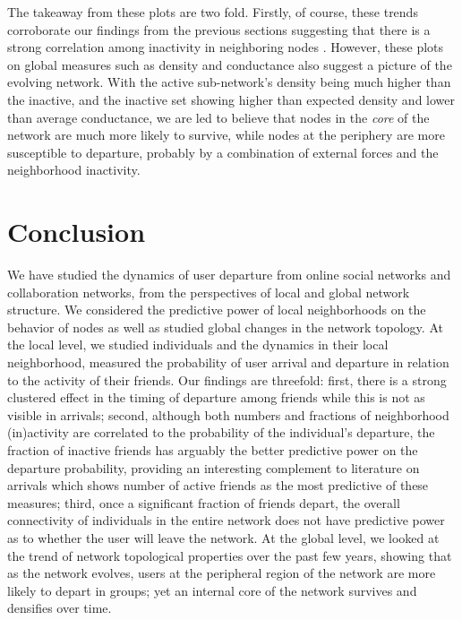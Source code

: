 \documentclass[phd,tocprelim]{cornell}
\begin{document}
The takeaway from these plots are two fold. Firstly, of course, these trends
corroborate our findings from the previous sections suggesting that there is a
strong correlation among inactivity in neighboring nodes 
. However, these plots on global measures such as density and conductance
also suggest a picture of the evolving network. With the active sub-network's density
being much higher than the inactive, and the inactive set showing higher than
expected density and lower than average conductance, we are led to believe that
nodes in the {\em core} of the network are much more likely to survive, while
nodes at the periphery are more susceptible to departure, probably by a combination of external forces and the neighborhood inactivity.

\section{Conclusion}
We have studied the dynamics of user departure from
online social networks and collaboration networks, from the perspectives of local and global network structure. 
We considered the predictive power of local
neighborhoods on the behavior of nodes as well as studied global
changes in the network topology. At the local level, we studied
individuals and the dynamics in their local neighborhood, measured the
probability of user arrival and departure in relation to the
activity of their friends. Our findings are threefold: first, there
is a strong clustered effect in the timing of departure among friends
while this is not as visible in arrivals; second, although both
numbers and fractions of neighborhood (in)activity are correlated to
the probability of the individual's departure, the fraction of
inactive friends has arguably the better predictive power on the departure
probability, providing an interesting complement to literature on arrivals which
shows number of active friends as the most predictive of these
measures; third, once a significant fraction of friends depart, the
overall connectivity of individuals in the entire network does not
have predictive power as to whether the user will leave the network. At the global level, we looked
at the trend of network topological properties over the past few
years, showing that as the network evolves, users at the peripheral
region of the network are more likely to depart in groups; yet an internal core
of the network survives and densifies over time. 
\end{document}
